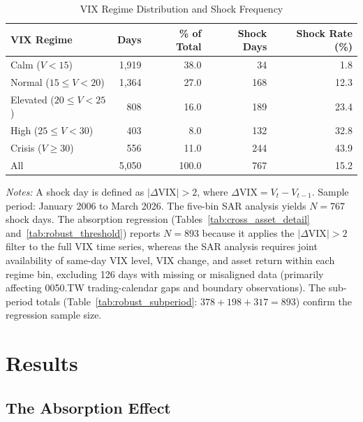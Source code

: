 \documentclass[12pt,a4paper]{article}
\begin{document}
\begin{table}[H]
\centering
\caption{VIX Regime Distribution and Shock Frequency}
\label{tab:regime_dist}
\begin{threeparttable}
\begin{tabular}{lrrrr}
\toprule
VIX Regime & Days & \% of Total & Shock Days & Shock Rate (\%) \\
\midrule
Calm ($V < 15$)              & 1,919 & 38.0 &  34 &  1.8 \\
Normal ($15 \leq V < 20$)    & 1,364 & 27.0 & 168 & 12.3 \\
Elevated ($20 \leq V < 25$)  &   808 & 16.0 & 189 & 23.4 \\
High ($25 \leq V < 30$)      &   403 &  8.0 & 132 & 32.8 \\
Crisis ($V \geq 30$)         &   556 & 11.0 & 244 & 43.9 \\
\addlinespace
All                           & 5,050 & 100.0 & 767 & 15.2 \\
\bottomrule
\end{tabular}
\begin{tablenotes}
\small
\item \textit{Notes:} A shock day is defined as $|\Delta\text{VIX}| > 2$, where $\Delta\text{VIX} = V_t - V_{t-1}$. Sample period: January 2006 to March 2026. The five-bin SAR analysis yields $N = 767$ shock days. The absorption regression (Tables~\ref{tab:cross_asset_detail} and~\ref{tab:robust_threshold}) reports $N = 893$ because it applies the $|\Delta\text{VIX}| > 2$ filter to the full VIX time series, whereas the SAR analysis requires joint availability of same-day VIX level, VIX change, and asset return within each regime bin, excluding 126 days with missing or misaligned data (primarily affecting 0050.TW trading-calendar gaps and boundary observations). The sub-period totals (Table~\ref{tab:robust_subperiod}: $378 + 198 + 317 = 893$) confirm the regression sample size.
\end{tablenotes}
\end{threeparttable}
\end{table}


\section{Results}
\label{sec:results}

\subsection{The Absorption Effect}
\label{sec:core}
\end{document}

